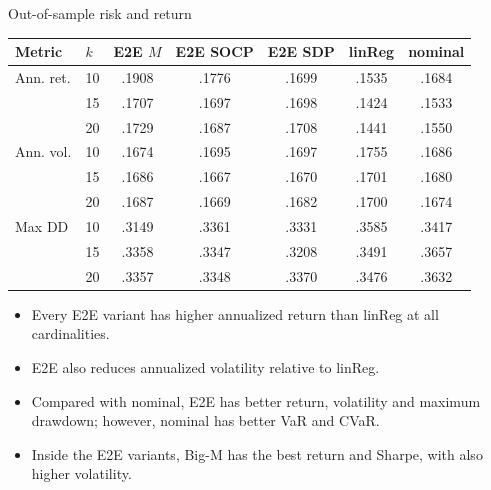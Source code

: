 \documentclass[10pt,aspectratio=169]{beamer}
\newcommand{\Kcard}{k}
\begin{document}
\begin{frame}{Out-of-sample risk and return}
  \centering\footnotesize
  \begin{tabular}{llccccc}
    \toprule
    Metric & $\Kcard$ & E2E $M$ & E2E SOCP & E2E SDP & linReg & nominal \\
    \midrule
    Ann. ret. & 10 & .1908 & .1776 & .1699 & .1535 & .1684 \\
              & 15 & .1707 & .1697 & .1698 & .1424 & .1533 \\
              & 20 & .1729 & .1687 & .1708 & .1441 & .1550 \\
    \midrule
    Ann. vol. & 10 & .1674 & .1695 & .1697 & .1755 & .1686 \\
              & 15 & .1686 & .1667 & .1670 & .1701 & .1680 \\
              & 20 & .1687 & .1669 & .1682 & .1700 & .1674 \\
    \midrule
    Max DD    & 10 & .3149 & .3361 & .3331 & .3585 & .3417 \\
              & 15 & .3358 & .3347 & .3208 & .3491 & .3657 \\
              & 20 & .3357 & .3348 & .3370 & .3476 & .3632 \\
    \bottomrule
  \end{tabular}

  \vspace{.2em}
  {\scriptsize
  \begin{itemize}
    \item Every E2E variant has higher annualized return than linReg at all cardinalities.
    \item E2E also reduces annualized volatility relative to linReg.
    \item Compared with nominal, E2E has better return, volatility and maximum drawdown; however, nominal has better VaR and CVaR.
    \item Inside the E2E variants, Big-M has the best return and Sharpe, with also higher volatility.
  \end{itemize}
  }
\end{frame}
\end{document}
